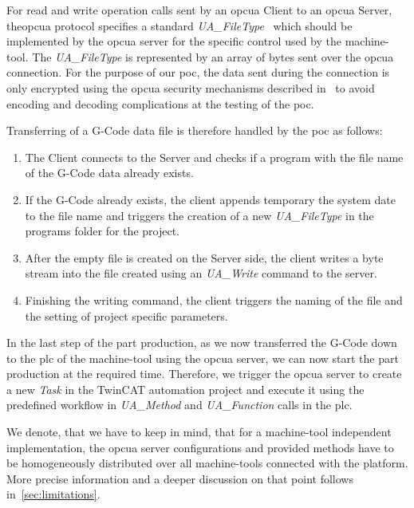 \documentclass[
a4paper,
twoside,
headsepline,
cleardoublepage=empty,
parskip=half,
draft=false
]{scrbook}
\begin{document}
				For read and write operation calls sent by an \gls{opcua} Client to an \gls{opcua} Server, the\gls{opcua} protocol specifies a standard \textit{UA\_FileType}~\cite{opcfoundation2017part5} which should be implemented by the \gls{opcua} server for the specific control used by the machine-tool. The \textit{UA\_FileType} is represented by an array of bytes sent over the \gls{opcua} connection. For the purpose of our \gls{poc}, the data sent during the connection is only encrypted using the \gls{opcua} security mechanisms described in~\cite{opcfoundation2017part1} to avoid encoding and decoding complications at the testing of the \gls{poc}.
				
				Transferring of a G-Code data file is therefore handled by the \gls{poc} as follows:

				\begin{enumerate}
					\item The Client connects to the Server and checks if a program with the file name of the G-Code data already exists.
					\item If the G-Code already exists, the client appends temporary the system date to the file name and triggers the creation of a new \textit{UA\_FileType} in the programs folder for the project.
					\item After the empty file is created on the Server side, the client writes a byte stream into the file created using an \textit{UA\_Write} command to the server.
					\item Finishing the writing command, the client triggers the naming of the file and the setting of project specific parameters.
				\end{enumerate}

				In the last step of the part production, as we now transferred the G-Code down to the \gls{plc} of the machine-tool using the \gls{opcua} server, we can now start the part production at the required time. Therefore, we trigger the \gls{opcua} server to create a new \textit{Task} in the TwinCAT automation project and execute it using the predefined workflow in \textit{UA\_Method} and \textit{UA\_Function} calls in the \gls{plc}.

				We denote, that we have to keep in mind, that for a machine-tool independent implementation, the \gls{opcua} server configurations and provided methods have to be homogeneously distributed over all machine-tools connected with the platform. More precise information and a deeper discussion on that point follows in~\cref{sec:limitations}.
\end{document}

